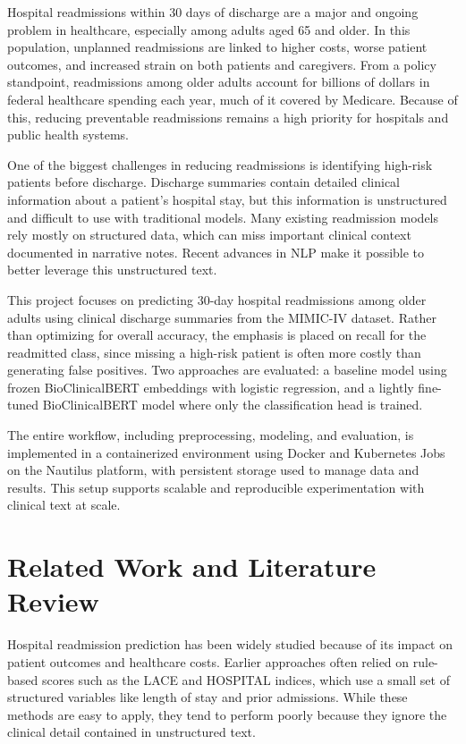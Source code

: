 \documentclass[11pt]{article}
\begin{document}
Hospital readmissions within 30 days of discharge are a major and ongoing problem in healthcare, especially among adults aged 65 and older. In this population, unplanned readmissions are linked to higher costs, worse patient outcomes, and increased strain on both patients and caregivers. From a policy standpoint, readmissions among older adults account for billions of dollars in federal healthcare spending each year, much of it covered by Medicare. Because of this, reducing preventable readmissions remains a high priority for hospitals and public health systems.

One of the biggest challenges in reducing readmissions is identifying high-risk patients before discharge. Discharge summaries contain detailed clinical information about a patient’s hospital stay, but this information is unstructured and difficult to use with traditional models. Many existing readmission models rely mostly on structured data, which can miss important clinical context documented in narrative notes. Recent advances in NLP make it possible to better leverage this unstructured text.

This project focuses on predicting 30-day hospital readmissions among older adults using clinical discharge summaries from the MIMIC-IV dataset. Rather than optimizing for overall accuracy, the emphasis is placed on recall for the readmitted class, since missing a high-risk patient is often more costly than generating false positives. Two approaches are evaluated: a baseline model using frozen BioClinicalBERT embeddings with logistic regression, and a lightly fine-tuned BioClinicalBERT model where only the classification head is trained.

The entire workflow, including preprocessing, modeling, and evaluation, is implemented in a containerized environment using Docker and Kubernetes Jobs on the Nautilus platform, with persistent storage used to manage data and results. This setup supports scalable and reproducible experimentation with clinical text at scale.

\section{Related Work and Literature Review}

Hospital readmission prediction has been widely studied because of its impact on patient outcomes and healthcare costs. Earlier approaches often relied on rule-based scores such as the LACE and HOSPITAL indices, which use a small set of structured variables like length of stay and prior admissions. While these methods are easy to apply, they tend to perform poorly because they ignore the clinical detail contained in unstructured text.
\end{document}
